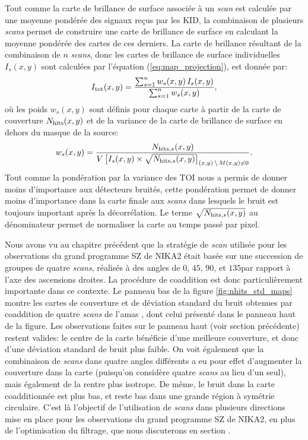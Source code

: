 Tout comme la carte de brillance de surface associée à un \textit{scan} est calculée par une moyenne pondérée des signaux reçus par les KID, la combinaison de plusieurs \textit{scans} permet de construire une carte de brillance de surface en calculant la moyenne pondérée des cartes de ces derniers.
La carte de brillance résultant de la combinaison de $n$ \textit{scans}, donc les cartes de brillance de surface individuelles $I_s(x,y)$ sont calculées par l'équation (\ref{eq:map_projection}), est donnée par:
\begin{equation}
    \label{eq:map_coadd}
    I_{\rm tot}(x, y) = \frac{\sum_{s=1}^{n} w_s(x, y) \, I_s(x, y)}{\sum_{s=1}^{n} w_s(x, y)},
\end{equation}
où les poids $w_s(x, y)$ sont définis pour chaque carte à partir de la carte de couverture $N_{\rm hits}(x, y)$ et de la variance de la carte de brillance de surface en dehors du masque de la source:
\begin{equation}
    \label{eq:coadd_weights}
    w_s(x, y) = \frac{N_{{\rm hits}, s}(x, y)}{V \, \big[ I_s(x, y) \times \sqrt{N_{{\rm hits}, s}(x, y)} \big]_{(x, y) \,\backslash\, M(x, y) \neq 0}}.
\end{equation}
Tout comme la pondération par la variance des TOI nous a permis de donner moins d'importance aux détecteurs bruités, cette pondération permet de donner moins d'importance dans la carte finale aux \textit{scans} dans lesquels le bruit est toujours important après la décorrélation.
Le terme $\sqrt{N_{{\rm hits}, s}(x, y)}$ au dénominateur permet de normaliser la carte au temps passé par pixel.

Nous avons vu au chapitre précédent que la stratégie de \textit{scan} utilisée pour les observations du grand programme SZ de NIKA2 était basée sur une succession de groupes de quatre \textit{scans}, réalisés à des angles de $0$\textdegree, $45$\textdegree, $90$\textdegree, et $135$\textdegree par rapport à l'axe des ascensions droites.
La procédure de coaddition est donc particulièrement importante dans ce contexte.
Le panneau bas de la figure \ref{fig:nhits_std_maps} montre les cartes de couverture et de déviation standard du bruit obtenues par coaddition de quatre \textit{scans} de l'amas \act, dont celui présenté dans le panneau haut de la figure.
Les observations faites sur le panneau haut (voir section précédente) restent valides: le centre de la carte bénéficie d'une meilleure couverture, et donc d'une déviation standard de bruit plus faible.
On voit également que la combinaison de \textit{scans} dans quatre angles différents a eu pour effet d'augmenter la couverture dans la carte (puisqu'on considère quatre \textit{scans} au lieu d'un seul), mais également de la rentre plus isotrope.
De même, le bruit dans la carte coadditionnée est plus bas, et reste bas dans une grande région à symétrie circulaire.
C'est là l'objectif de l'utilisation de \textit{scans} dans plusieurs directions mise en place pour les observations du grand programme SZ de NIKA2, en plus de l'optimisation du filtrage, que nous discuterons en section .

